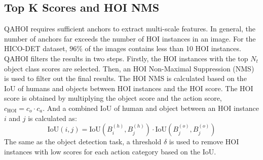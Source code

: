 \documentclass[10pt,twocolumn,letterpaper]{article}
\begin{document}
\subsection{Top K Scores and HOI NMS}
QAHOI requires sufficient anchors to extract multi-scale features. 
In general, the number of anchors far exceeds the number of HOI instances in an image. For the HICO-DET dataset, $96\%$ of the images contains less than 10 HOI instances. 
QAHOI filters the results in two steps. Firstly, the HOI instances with the top $N_{t}$ object class scores are selected. 
Then, an HOI Non-Maximal Suppression (NMS) is used to filter out the final results. The HOI NMS is calculated based on the IoU of humans and objects between HOI instances and the HOI score.
The HOI score is obtained by multiplying the object score and the action score, $c_{\text{HOI}}=c_{o}\cdot c_{a}$.
And a combined IoU of human and object between an HOI instance $i$ and $j$ is calculated as:
\begin{equation}
  \text{IoU}(i, j) = \text{IoU}(B^{(h)}_{i},B^{(h)}_{j})\cdot \text{IoU}(B^{(o)}_{j},B^{(o)}_{j})
  \label{eq:nms}
\end{equation}
The same as the object detection task, a threshold $\delta$ is used to remove HOI instances with low scores for each action category based on the IoU.
\end{document}
